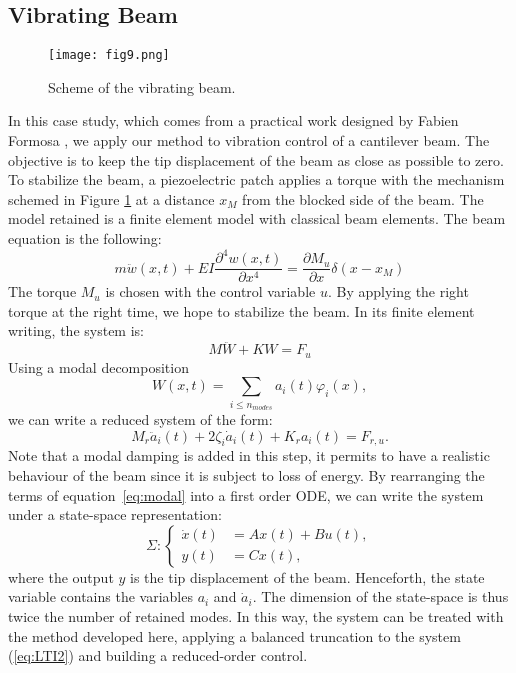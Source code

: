   
  \subsection{Vibrating Beam}
  
    \begin{figure}
    \centering
  \texttt{[image: fig9.png]}
  \caption{Scheme of the vibrating beam.}
  \label{fig:fig9}
  \end{figure}
  In this case study, which comes from a practical work designed by Fabien Formosa \cite{formosa},
  we apply our method to vibration  control of a cantilever beam.
  The objective is to keep the tip displacement of the beam as close as possible to zero.
  To stabilize the beam, a piezoelectric patch applies a torque with the mechanism schemed in
  Figure \ref{fig:fig9} at a distance $x_M$ from the blocked side of the beam.
  The model retained is a finite element model with classical beam elements.
  The beam equation is the following:
  \begin{equation}
   m \ddot{w}(x,t) + EI \dfrac{\partial^4 w(x,t)}{\partial x^ 4} = \dfrac{\partial M_u}{\partial x}
   \delta(x - x_M)
  \end{equation}
  The torque $M_u$ is chosen with the control variable $u$. By applying the 
  right torque at the right time, we hope to stabilize the beam.
  In its finite element writing, the system is:
  \begin{equation}
   M \ddot{W} + K W = F_u
      \label{eq:EF_vib}
  \end{equation}
  Using a modal decomposition 
  \[\displaystyle W(x,t) = \sum_{i\leq {n_{modes}}} a_i(t) \varphi_i(x),\]
  we can write a reduced system of the form:
  \begin{equation}
   M_r \ddot{a}_i(t) + 2 \zeta_i \dot{a}_i(t) + K_r a_i(t) = F_{r,u}.
   \label{eq:modal}
  \end{equation}
  Note that a modal damping is added in this step, it permits to have a realistic behaviour
  of the beam since it is subject to loss of energy.
  By rearranging the terms
  of equation~\eqref{eq:modal} into
  a first order ODE, we can write the system under a state-space representation:
\begin{equation}
 \Sigma : \left\lbrace
\begin{array}{ll}
\dot x(t) & = A x(t)+B u(t), \\
 y(t) & =C x(t),
\end{array}
\right.
\label{eq:LTI2}
\end{equation}
 where the output $y$ is the tip displacement of the beam. Henceforth, the state variable contains
 the variables $a_i$ and $\dot a_i$. The dimension of the state-space is thus twice the number
 of retained modes. In this way, the system can be treated with the method developed here, applying a
 balanced truncation to the system (\ref{eq:LTI2}) and building a reduced-order control.
  
